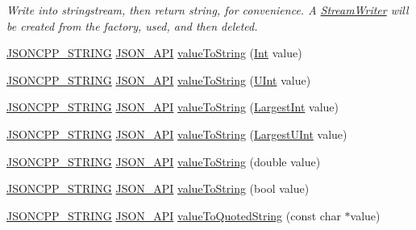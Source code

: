 \begin{DoxyCompactItemize}
\begin{DoxyCompactList}\small\item\em Write into stringstream, then return string, for convenience. A \hyperlink{class_json_1_1_stream_writer}{Stream\+Writer} will be created from the factory, used, and then deleted. \end{DoxyCompactList}\item 
\hyperlink{json_8h_a1e723f95759de062585bc4a8fd3fa4be}{J\+S\+O\+N\+C\+P\+P\+\_\+\+S\+T\+R\+I\+NG} \hyperlink{json_8h_a1d61ffde86ce1a18fd83194ff0d9a206}{J\+S\+O\+N\+\_\+\+A\+PI} \hyperlink{namespace_json_a498503e8f49d6a3811e3c9f6757da60d}{value\+To\+String} (\hyperlink{namespace_json_a08122e8005b706d982e48cca1e2119c7}{Int} value)
\item 
\hyperlink{json_8h_a1e723f95759de062585bc4a8fd3fa4be}{J\+S\+O\+N\+C\+P\+P\+\_\+\+S\+T\+R\+I\+NG} \hyperlink{json_8h_a1d61ffde86ce1a18fd83194ff0d9a206}{J\+S\+O\+N\+\_\+\+A\+PI} \hyperlink{namespace_json_ab2cb54f173193c8d27c3eb7f10b6e79a}{value\+To\+String} (\hyperlink{namespace_json_a800fb90eb6ee8d5d62b600c06f87f7d4}{U\+Int} value)
\item 
\hyperlink{json_8h_a1e723f95759de062585bc4a8fd3fa4be}{J\+S\+O\+N\+C\+P\+P\+\_\+\+S\+T\+R\+I\+NG} \hyperlink{json_8h_a1d61ffde86ce1a18fd83194ff0d9a206}{J\+S\+O\+N\+\_\+\+A\+PI} \hyperlink{namespace_json_a4732517cb28d203cfd4354d05952a81b}{value\+To\+String} (\hyperlink{namespace_json_a218d880af853ce786cd985e82571d297}{Largest\+Int} value)
\item 
\hyperlink{json_8h_a1e723f95759de062585bc4a8fd3fa4be}{J\+S\+O\+N\+C\+P\+P\+\_\+\+S\+T\+R\+I\+NG} \hyperlink{json_8h_a1d61ffde86ce1a18fd83194ff0d9a206}{J\+S\+O\+N\+\_\+\+A\+PI} \hyperlink{namespace_json_a6283ea3db02efe9104ae6baff698245a}{value\+To\+String} (\hyperlink{namespace_json_ae202ecad69725e23443f465e257456d0}{Largest\+U\+Int} value)
\item 
\hyperlink{json_8h_a1e723f95759de062585bc4a8fd3fa4be}{J\+S\+O\+N\+C\+P\+P\+\_\+\+S\+T\+R\+I\+NG} \hyperlink{json_8h_a1d61ffde86ce1a18fd83194ff0d9a206}{J\+S\+O\+N\+\_\+\+A\+PI} \hyperlink{namespace_json_a3cf0c8dbbdb898c4a6fad54670b34bd1}{value\+To\+String} (double value)
\item 
\hyperlink{json_8h_a1e723f95759de062585bc4a8fd3fa4be}{J\+S\+O\+N\+C\+P\+P\+\_\+\+S\+T\+R\+I\+NG} \hyperlink{json_8h_a1d61ffde86ce1a18fd83194ff0d9a206}{J\+S\+O\+N\+\_\+\+A\+PI} \hyperlink{namespace_json_a0a706a1fffba4fe8a8c1ef75b2dbbfab}{value\+To\+String} (bool value)
\item 
\hyperlink{json_8h_a1e723f95759de062585bc4a8fd3fa4be}{J\+S\+O\+N\+C\+P\+P\+\_\+\+S\+T\+R\+I\+NG} \hyperlink{json_8h_a1d61ffde86ce1a18fd83194ff0d9a206}{J\+S\+O\+N\+\_\+\+A\+PI} \hyperlink{namespace_json_aaf777a6923bcb4cf63a2729973fe5315}{value\+To\+Quoted\+String} (const char $\ast$value)

\end{DoxyCompactItemize}
